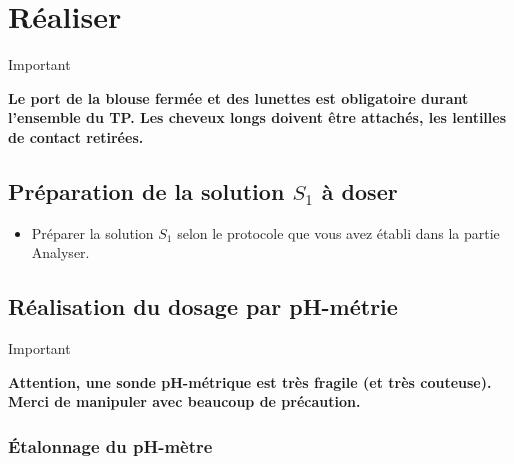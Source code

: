 \documentclass[a4paper, 10pt, final, garamond]{book}
\begin{document}
\section{Réaliser}

\begin{bror}{Important}
    \begin{center}
        \bfseries
        Le port de la blouse fermée et des lunettes est obligatoire durant
        l'ensemble du TP. Les cheveux longs doivent être attachés, les lentilles
        de contact retirées.
    \end{center}
\end{bror}

\subsection{Préparation de la solution $S_1$ à doser}

\begin{itemize}[label=$\triangleright$]
    \item Préparer la solution $S_1$ selon le protocole que vous avez établi
        dans la partie Analyser. 
\end{itemize}

\subsection{Réalisation du dosage par pH-métrie}

\begin{bror}{Important}
    \begin{center}
        \bfseries
        Attention, une sonde pH-métrique est très fragile (et très couteuse).
        Merci de manipuler avec beaucoup de précaution.
    \end{center}
\end{bror}

\subsubsection{Étalonnage du pH-mètre}
\end{document}
